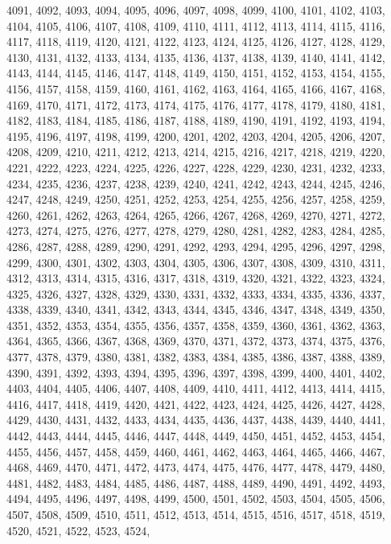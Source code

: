 4091,
4092,
4093,
4094,
4095,
4096,
4097,
4098,
4099,
4100,
4101,
4102,
4103,
4104,
4105,
4106,
4107,
4108,
4109,
4110,
4111,
4112,
4113,
4114,
4115,
4116,
4117,
4118,
4119,
4120,
4121,
4122,
4123,
4124,
4125,
4126,
4127,
4128,
4129,
4130,
4131,
4132,
4133,
4134,
4135,
4136,
4137,
4138,
4139,
4140,
4141,
4142,
4143,
4144,
4145,
4146,
4147,
4148,
4149,
4150,
4151,
4152,
4153,
4154,
4155,
4156,
4157,
4158,
4159,
4160,
4161,
4162,
4163,
4164,
4165,
4166,
4167,
4168,
4169,
4170,
4171,
4172,
4173,
4174,
4175,
4176,
4177,
4178,
4179,
4180,
4181,
4182,
4183,
4184,
4185,
4186,
4187,
4188,
4189,
4190,
4191,
4192,
4193,
4194,
4195,
4196,
4197,
4198,
4199,
4200,
4201,
4202,
4203,
4204,
4205,
4206,
4207,
4208,
4209,
4210,
4211,
4212,
4213,
4214,
4215,
4216,
4217,
4218,
4219,
4220,
4221,
4222,
4223,
4224,
4225,
4226,
4227,
4228,
4229,
4230,
4231,
4232,
4233,
4234,
4235,
4236,
4237,
4238,
4239,
4240,
4241,
4242,
4243,
4244,
4245,
4246,
4247,
4248,
4249,
4250,
4251,
4252,
4253,
4254,
4255,
4256,
4257,
4258,
4259,
4260,
4261,
4262,
4263,
4264,
4265,
4266,
4267,
4268,
4269,
4270,
4271,
4272,
4273,
4274,
4275,
4276,
4277,
4278,
4279,
4280,
4281,
4282,
4283,
4284,
4285,
4286,
4287,
4288,
4289,
4290,
4291,
4292,
4293,
4294,
4295,
4296,
4297,
4298,
4299,
4300,
4301,
4302,
4303,
4304,
4305,
4306,
4307,
4308,
4309,
4310,
4311,
4312,
4313,
4314,
4315,
4316,
4317,
4318,
4319,
4320,
4321,
4322,
4323,
4324,
4325,
4326,
4327,
4328,
4329,
4330,
4331,
4332,
4333,
4334,
4335,
4336,
4337,
4338,
4339,
4340,
4341,
4342,
4343,
4344,
4345,
4346,
4347,
4348,
4349,
4350,
4351,
4352,
4353,
4354,
4355,
4356,
4357,
4358,
4359,
4360,
4361,
4362,
4363,
4364,
4365,
4366,
4367,
4368,
4369,
4370,
4371,
4372,
4373,
4374,
4375,
4376,
4377,
4378,
4379,
4380,
4381,
4382,
4383,
4384,
4385,
4386,
4387,
4388,
4389,
4390,
4391,
4392,
4393,
4394,
4395,
4396,
4397,
4398,
4399,
4400,
4401,
4402,
4403,
4404,
4405,
4406,
4407,
4408,
4409,
4410,
4411,
4412,
4413,
4414,
4415,
4416,
4417,
4418,
4419,
4420,
4421,
4422,
4423,
4424,
4425,
4426,
4427,
4428,
4429,
4430,
4431,
4432,
4433,
4434,
4435,
4436,
4437,
4438,
4439,
4440,
4441,
4442,
4443,
4444,
4445,
4446,
4447,
4448,
4449,
4450,
4451,
4452,
4453,
4454,
4455,
4456,
4457,
4458,
4459,
4460,
4461,
4462,
4463,
4464,
4465,
4466,
4467,
4468,
4469,
4470,
4471,
4472,
4473,
4474,
4475,
4476,
4477,
4478,
4479,
4480,
4481,
4482,
4483,
4484,
4485,
4486,
4487,
4488,
4489,
4490,
4491,
4492,
4493,
4494,
4495,
4496,
4497,
4498,
4499,
4500,
4501,
4502,
4503,
4504,
4505,
4506,
4507,
4508,
4509,
4510,
4511,
4512,
4513,
4514,
4515,
4516,
4517,
4518,
4519,
4520,
4521,
4522,
4523,
4524,
